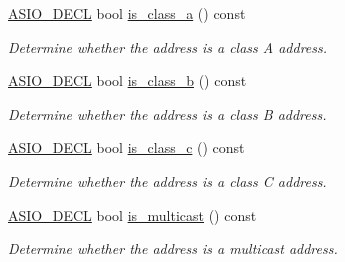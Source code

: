 \begin{DoxyCompactItemize}
\hyperlink{config_8hpp_ab54d01ea04afeb9a8b39cfac467656b7}{A\+S\+I\+O\+\_\+\+D\+E\+C\+L} bool \hyperlink{classasio_1_1ip_1_1address__v4_a34c3394c39a8fe26b2e04439672413f3}{is\+\_\+class\+\_\+a} () const 
\begin{DoxyCompactList}\small\item\em Determine whether the address is a class A address. \end{DoxyCompactList}\item 
\hyperlink{config_8hpp_ab54d01ea04afeb9a8b39cfac467656b7}{A\+S\+I\+O\+\_\+\+D\+E\+C\+L} bool \hyperlink{classasio_1_1ip_1_1address__v4_a3656f5bef6050e700d7adbc182935a8e}{is\+\_\+class\+\_\+b} () const 
\begin{DoxyCompactList}\small\item\em Determine whether the address is a class B address. \end{DoxyCompactList}\item 
\hyperlink{config_8hpp_ab54d01ea04afeb9a8b39cfac467656b7}{A\+S\+I\+O\+\_\+\+D\+E\+C\+L} bool \hyperlink{classasio_1_1ip_1_1address__v4_a24e67af7055e3b402d38d020083c76ea}{is\+\_\+class\+\_\+c} () const 
\begin{DoxyCompactList}\small\item\em Determine whether the address is a class C address. \end{DoxyCompactList}\item 
\hyperlink{config_8hpp_ab54d01ea04afeb9a8b39cfac467656b7}{A\+S\+I\+O\+\_\+\+D\+E\+C\+L} bool \hyperlink{classasio_1_1ip_1_1address__v4_a6b491cf55c45b94a721d17252c8aeea0}{is\+\_\+multicast} () const 
\begin{DoxyCompactList}\small\item\em Determine whether the address is a multicast address. \end{DoxyCompactList}\end{DoxyCompactItemize}
